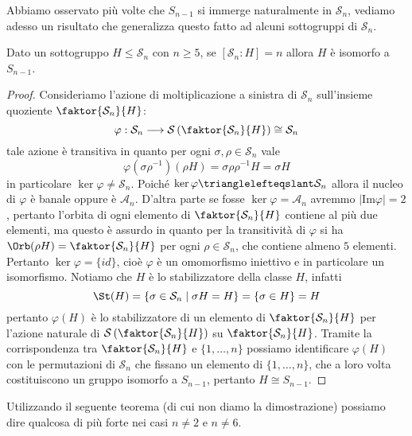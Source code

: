 \documentclass[11pt]{scrartcl}
\begin{document}
	Abbiamo osservato più volte che $S_{n - 1}$ si immerge naturalmente in $\mathcal{S}_n$,
	vediamo adesso un risultato che generalizza questo fatto ad alcuni sottogruppi di 
	$\mathcal{S}_n$.
	
	\begin{proposition}
		\label{prop1.68}
		Dato un sottogruppo $H\leqslant \mathcal{S}_n$ con $n \geq 5$, se $[\mathcal{S}_n : H] = n$ allora $H$ è 
		isomorfo a $S_{n - 1}$.
	\end{proposition}
	
	\begin{proof}
		Consideriamo l'azione di moltiplicazione a sinistra di $\mathcal{S}_n$ sull'insieme
		quoziente $\faktor{\mathcal{S}_n}{H}$:
		\[
		\varphi: \mathcal{S}_n\longrightarrow\mathcal{S}\left(\faktor{\mathcal{S}_n}{H}\right) \cong \mathcal{S}_n
		\]
		tale azione è transitiva in quanto per ogni $\sigma, \rho \in \mathcal{S}_n$ vale
		\[
		\varphi(\sigma\rho^{-1})(\rho H) = \sigma \rho\rho^{-1}H = \sigma H
		\]
		in particolare $\ker \varphi \neq \mathcal{S}_n$. Poiché $\ker\varphi \trianglelefteqslant \mathcal{S}_n$
		allora il nucleo di $\varphi$ è banale oppure è $\mathcal{A}_n$. D'altra 
		parte se fosse $\ker \varphi = \mathcal{A}_n$ avremmo $|\mathrm{Im}\varphi| = 2$,
		pertanto l'orbita di ogni elemento di $\faktor{\mathcal{S}_n}{H}$ contiene al più 
		due elementi, ma questo è assurdo in quanto per la transitività di $\varphi$
		si ha $\Orb(\rho H) = \faktor{\mathcal{S}_n}{H}$ per ogni $\rho \in \mathcal{S}_n$, che contiene almeno $5$ elementi.
		Pertanto $\ker\varphi = \{id\}$, cioè $\varphi$ è un omomorfismo iniettivo e
		in particolare un isomorfismo.
		Notiamo che $H$ è lo stabilizzatore della classe $H$, infatti
		\[
		\St(H) = \{\sigma \in \mathcal{S}_n \mid \sigma H = H\} = \{\sigma \in H\} = H
		\]
		pertanto $\varphi(H)$ è lo stabilizzatore di un elemento di $\faktor{\mathcal{S}_n}{H}$
		per l'azione naturale di $\mathcal{S}\left(\faktor{\mathcal{S}_n}{H}\right)$ su $\faktor{\mathcal{S}_n}{H}$.
		Tramite la corrispondenza tra $\faktor{\mathcal{S}_n}{H}$ e $\{1, \ldots, n\}$
		possiamo identificare $\varphi(H)$ con le permutazioni di $\mathcal{S}_n$ che fissano
		un elemento di $\{1, \ldots, n\}$, che a loro volta costituiscono un 
		gruppo isomorfo a $S_{n - 1}$, pertanto $H \cong S_{n - 1}$.
	\end{proof}
	
	Utilizzando il seguente teorema (di cui non diamo la dimostrazione) possiamo
	dire qualcosa di più forte nei casi $n \neq 2$ e $n \neq 6$.
	
\end{document}

